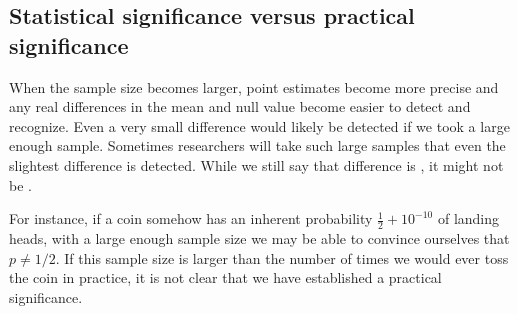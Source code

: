 

\subsection{Statistical significance versus practical significance}

When the sample size becomes larger, point estimates become more precise and any real differences in the mean and null value become easier to detect and recognize. Even a very small difference would likely be detected if we took a large enough sample. Sometimes researchers will take such large samples that even the slightest difference is detected. While we still say that difference is , it might not be .

For instance, if a coin somehow has an inherent probability $\frac12+10^{-10}$ of landing heads, with a large enough sample size we may be able to convince ourselves that $p\ne 1/2$.
If this sample size is larger than the number of times we would ever toss the coin in practice, it is not clear that we have established a practical significance.
